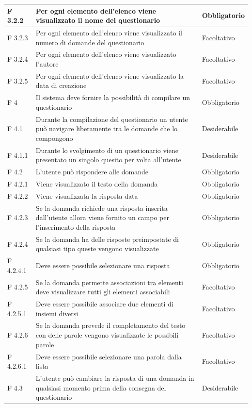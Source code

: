 \documentclass[a4paper,11pt]{article}
\begin{document}
\begin{longtable}{p{}p{}p{}}
\midrule
F 3.2.2 & Per ogni elemento dell'elenco viene visualizzato il nome del questionario & Obbligatorio\\
\midrule
F 3.2.3 & Per ogni elemento dell'elenco viene visualizzato il numero di domande del questionario & Facoltativo\\
\midrule
F 3.2.4 & Per ogni elemento dell'elenco viene visualizzato l'autore & Facoltativo\\
\midrule
F 3.2.5 & Per ogni elemento dell'elenco viene visualizzato la data di creazione & Facoltativo\\
\midrule
F 4 & Il sistema deve fornire la possibilità di compilare un questionario & Obbligatorio\\
\midrule
F 4.1 & Durante la compilazione del questionario un utente può navigare liberamente tra le domande che lo compongono & Desiderabile\\
\midrule
F 4.1.1 & Durante lo svolgimento di un questionario viene presentato un singolo quesito per volta all'utente & Desiderabile\\
\midrule
F 4.2 & L'utente può rispondere alle domande & Obbligatorio\\
\midrule
F 4.2.1 & Viene visualizzato il testo della domanda & Obbligatorio\\
\midrule
F 4.2.2 & Viene visualizzata la risposta data & Obbligatorio\\
\midrule
F 4.2.3 & Se la domanda richiede una risposta inserita dall'utente allora viene fornito un campo per l'inserimento della risposta & Obbligatorio\\
\midrule
F 4.2.4 & Se la domanda ha delle risposte preimpostate di qualsiasi tipo queste vengono visualizzate & Obbligatorio\\
\midrule
F 4.2.4.1 & Deve essere possibile selezionare una risposta & Obbligatorio\\
\midrule
F 4.2.5 & Se la domanda permette associazioni tra elementi deve visualizzare tutti gli elementi associabili & Facoltativo\\
\midrule
F 4.2.5.1 & Deve essere possibile associare due elementi di insiemi diversi & Facoltativo\\
\midrule
F 4.2.6 & Se la domanda prevede il completamento del testo con delle parole vengono visualizzate le possibili parole & Facoltativo\\
\midrule
F 4.2.6.1 & Deve essere possibile selezionare una parola dalla lista & Facoltativo\\
\midrule
F 4.3 & L'utente può cambiare la risposta di una domanda in qualsiasi momento prima della consegna del questionario & Desiderabile\\

\end{longtable}
\end{document}
